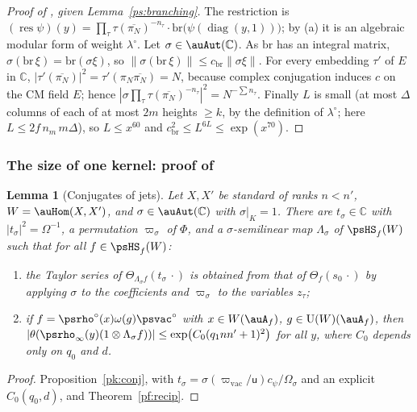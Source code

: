 \documentclass[10pt]{amsart}
\newtheorem{lemma}[theorem]{Lemma}
\theoremstyle{definition}
\theoremstyle{remark}
\newcommand{\C}{\mathbb C}
\providecommand{\auPl}{\Phi}
\providecommand{\auU}{\mathrm U}
\providecommand{\aubar}[1]{\overline{#1}}
\begin{document}
\begin{proof}[Proof of {\cite[Proposition~14.24]{P46}}, given Lemma~\ref{ps:branching}]
The restriction is $(\operatorname{res}\psi)(y)=\prod_\tau\tau(\aubar{\pi_N})^{-n_\tau}\cdot
\mathrm{br}\bigl(\psi(\operatorname{diag}(y,1))\bigr)$; by (a) it is an algebraic modular form of
weight $\lambda^\circ$. Let $\sigma\in\auAut(\C)$. As $\mathrm{br}$ has an integral matrix,
$\sigma(\mathrm{br}\,\xi)=\mathrm{br}(\sigma\xi)$, so $\|\sigma(\mathrm{br}\,\xi)\|\le
c_{\mathrm{br}}\|\sigma\xi\|$. For every embedding $\tau'$ of $E$ in $\C$,
$|\tau'(\aubar{\pi_N})|^2=\tau'(\pi_N\aubar{\pi_N})=N$, because complex conjugation induces $c$ on
the CM field $E$; hence $|\sigma\prod_\tau\tau(\aubar{\pi_N})^{-n_\tau}|^2=N^{-\sum n_\tau}$.
Finally $L$ is small (at most $\Delta$ columns of each of at most $2m$ heights
$\ge k$, by the definition of $\lambda^\circ$; here $L\le2f\,n_m\,m\Delta$), so $L\le x^{60}$ and $c_{\mathrm{br}}^2\le
L^{6L}\le\exp(x^{70})$.
\end{proof}

\subsubsection{The size of one kernel: proof of \texorpdfstring{{\cite[Proposition~14.23]{P46}}}{[Row D, Proposition~14.23]}}\label{ps:ss-kernel}

\begin{lemma}[Conjugates of jets]\label{ps:conj}
Let $X,X'$ be standard of ranks $n<n'$, $W=\auHom(X,X')$, and $\sigma\in\auAut(\C)$ with
$\sigma|_K=1$. There are $t_\sigma\in\C$ with $|t_\sigma|^2=\Omega^{-1}$, a permutation
$\varpi_\sigma$ of $\auPl$, and a $\sigma$-semilinear map $\Lambda_\sigma$ of $\psHS_f(W)$ such
that for all $f\in\psHS_f(W)$:
\begin{enumerate}
\item[(i)] the Taylor series of $\Theta_{\Lambda_\sigma f}(t_\sigma\,\cdot)$ is obtained from that
of $\Theta_f(s_0\,\cdot)$ by applying $\sigma$ to the coefficients and $\varpi_\sigma$ to the
variables $z_\tau$;
\item[(ii)] if $f=\psrho^\circ(x)\omega(g)\psvac^\circ$ with $x\in W(\auA_f)$, $g\in\auU(W)
(\auA_f)$, then $|\theta(\psrho_\infty(y)(1\otimes\Lambda_\sigma f))|\le\exp\bigl(C_0(q_1nn'+1)^2
\bigr)$ for all $y$, where $C_0$ depends only on $q_0$ and $d$.
\end{enumerate}
\end{lemma}
\begin{proof} Proposition~\ref{pk:conj}, with $t_\sigma=\sigma(\varpi_{\mathrm{vac}}/\mathsf u)c_\psi/
\Omega_\sigma$ and an explicit $C_0(q_0,d)$, and Theorem~\ref{pf:recip}.\end{proof}
\end{document}
